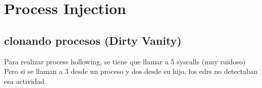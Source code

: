 \chapter{Process Injection}

\section{clonando procesos (Dirty Vanity)}

Para realizar process hollowing, se tiene que llamar a 5 syscalls (muy ruidoso)
Pero si se llaman a 3 desde un proceso y dos desde su hijo, los edrs no
detectaban esa actividad